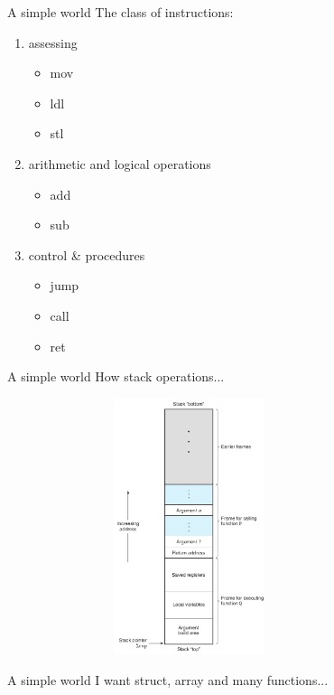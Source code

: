 \documentclass[UKenglish]{beamer}
\begin{document}
\begin{frame}{A simple world}
  The class of instructions:
  \begin{enumerate}
  \item assessing
    \begin{itemize}
    \item mov
    \item ldl
    \item stl
    \end{itemize}
  \item arithmetic and logical operations
    \begin{itemize}
  \item add
  \item sub
    \end{itemize}
  \item control \& procedures
    \begin{itemize}
  \item jump
  \item call
  \item ret
    \end{itemize}
  \end{enumerate}
\end{frame}

\begin{frame}{A simple world}
  How stack operations...
  \begin{center}
    \includegraphics[width = 0.8\textwidth, height=7.5cm]{stack.png}
  \end{center}
\end{frame}

  \begin{frame}{A simple world}
    I want struct, array and many functions...
  \end{frame}
\end{document}
